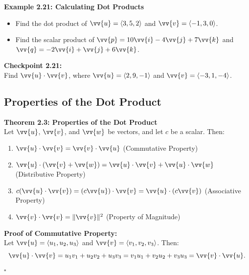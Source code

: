 \documentclass{article}
\begin{document}
\begin{examplebox}
    \textbf{Example 2.21: Calculating Dot Products} \\
    \begin{itemize}
        \item Find the dot product of \(\vv{u} = \langle 3, 5, 2 \rangle\) and \(\vv{v} = \langle -1, 3, 0 \rangle\).
        \item Find the scalar product of \(\vv{p} = 10\vv{i} - 4\vv{j} + 7\vv{k}\) and \(\vv{q} = -2\vv{i} + \vv{j} + 6\vv{k}\).
    \end{itemize}
\end{examplebox}

\begin{exercisebox}
    \textbf{Checkpoint 2.21:} \\
    Find \(\vv{u} \cdot \vv{v}\), where \(\vv{u} = \langle 2, 9, -1 \rangle\) and \(\vv{v} = \langle -3, 1, -4 \rangle\).
\end{exercisebox}

\subsection*{Properties of the Dot Product}

\begin{theorembox}
    \textbf{Theorem 2.3: Properties of the Dot Product} \\
    Let \(\vv{u}\), \(\vv{v}\), and \(\vv{w}\) be vectors, and let \(c\) be a scalar. Then:
    \begin{enumerate}
        \item \(\vv{u} \cdot \vv{v} = \vv{v} \cdot \vv{u}\) \quad (Commutative Property)
        \item \(\vv{u} \cdot (\vv{v} + \vv{w}) = \vv{u} \cdot \vv{v} + \vv{u} \cdot \vv{w}\) \quad (Distributive Property)
        \item \(c(\vv{u} \cdot \vv{v}) = (c\vv{u}) \cdot \vv{v} = \vv{u} \cdot (c\vv{v})\) \quad (Associative Property)
        \item \(\vv{v} \cdot \vv{v} = \|\vv{v}\|^2\) \quad (Property of Magnitude)
    \end{enumerate}
\end{theorembox}

\begin{proofbox}
    \textbf{Proof of Commutative Property:} \\
    Let \(\vv{u} = \langle u_1, u_2, u_3 \rangle\) and \(\vv{v} = \langle v_1, v_2, v_3 \rangle\). Then:
    \[
    \vv{u} \cdot \vv{v} = u_1 v_1 + u_2 v_2 + u_3 v_3 = v_1 u_1 + v_2 u_2 + v_3 u_3 = \vv{v} \cdot \vv{u}.
    \]
    \(\square\)
\end{proofbox}
\end{document}
